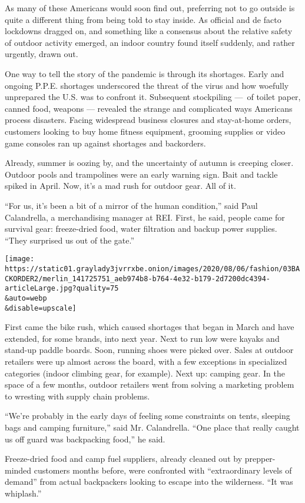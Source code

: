 As many of these Americans would soon find out, preferring not to go
outside is quite a different thing from being told to stay inside. As
official and de facto lockdowns dragged on, and something like a
consensus about the relative safety of outdoor activity emerged, an
indoor country found itself suddenly, and rather urgently, drawn out.

One way to tell the story of the pandemic is through its shortages.
Early and ongoing P.P.E. shortages underscored the threat of the virus
and how woefully unprepared the U.S. was to confront it. Subsequent
stockpiling ---~of toilet paper, canned food, weapons --- revealed the
strange and complicated ways Americans process disasters. Facing
widespread business closures and stay-at-home orders, customers looking
to buy home fitness equipment, grooming supplies or video game consoles
ran up against shortages and backorders.

Already, summer is oozing by, and the uncertainty of autumn is creeping
closer. Outdoor pools and trampolines were an early warning sign. Bait
and tackle spiked in April. Now, it's a mad rush for outdoor gear. All
of it.

``For us, it's been a bit of a mirror of the human condition,'' said
Paul Calandrella, a merchandising manager at REI. First, he said, people
came for survival gear: freeze-dried food, water filtration and backup
power supplies. ``They surprised us out of the gate.''

\texttt{[image: https://static01.graylady3jvrrxbe.onion/images/2020/08/06/fashion/03BACKORDER2/merlin\_141725751\_aeb974b8-b764-4e32-b179-2d7200dc4394-articleLarge.jpg?quality=75\\\&auto=webp\\\&disable=upscale]}

First came the bike rush, which caused shortages that began in March and
have extended, for some brands, into next year. Next to run low were
kayaks and stand-up paddle boards. Soon, running shoes were picked over.
Sales at outdoor retailers were up almost across the board, with a few
exceptions in specialized categories (indoor climbing gear, for
example). Next up: camping gear. In the space of a few months, outdoor
retailers went from solving a marketing problem to wresting with supply
chain problems.

``We're probably in the early days of feeling some constraints on tents,
sleeping bags and camping furniture,'' said Mr. Calandrella. ``One place
that really caught us off guard was backpacking food,'' he said.

Freeze-dried food and camp fuel suppliers, already cleaned out by
prepper-minded customers months before, were confronted with
``extraordinary levels of demand'' from actual backpackers looking to
escape into the wilderness. ``It was whiplash.''

